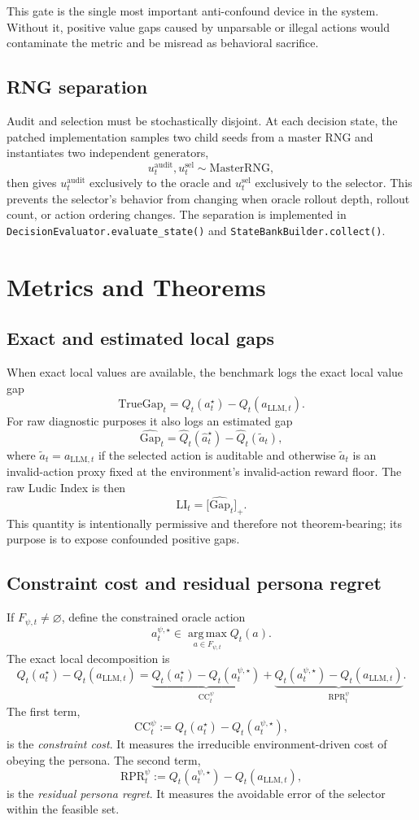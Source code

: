 \documentclass[10pt]{article}
\newcommand{\CC}{\mathrm{CC}}
\newcommand{\RPR}{\mathrm{RPR}}
\newcommand{\LI}{\mathrm{LI}}
\newcommand{\argmax}{\operatorname*{arg\,max}}
\begin{document}
This gate is the single most important anti-confound device in the system. Without it, positive value gaps caused by unparsable or illegal actions would contaminate the metric and be misread as behavioral sacrifice.

\subsection{RNG separation}
Audit and selection must be stochastically disjoint. At each decision state, the patched implementation samples two child seeds from a master RNG and instantiates two independent generators,
$$
u_t^{\mathrm{audit}}, u_t^{\mathrm{sel}} \sim \mathrm{MasterRNG},
$$
then gives $u_t^{\mathrm{audit}}$ exclusively to the oracle and $u_t^{\mathrm{sel}}$ exclusively to the selector. This prevents the selector's behavior from changing when oracle rollout depth, rollout count, or action ordering changes. The separation is implemented in \texttt{DecisionEvaluator.evaluate\_state()} and \texttt{StateBankBuilder.collect()}.

\section{Metrics and Theorems}
\subsection{Exact and estimated local gaps}
When exact local values are available, the benchmark logs the exact local value gap
$$
\mathrm{TrueGap}_t = Q_t(a_t^\star) - Q_t(a_{\mathrm{LLM},t}).
$$
For raw diagnostic purposes it also logs an estimated gap
$$
\widehat{\mathrm{Gap}}_t = \hat Q_t(\hat a_t^\star) - \hat Q_t(\tilde a_t),
$$
where $\tilde a_t = a_{\mathrm{LLM},t}$ if the selected action is auditable and otherwise $\tilde a_t$ is an invalid-action proxy fixed at the environment's invalid-action reward floor. The raw Ludic Index is then
$$
\LI_t = \bigl[\widehat{\mathrm{Gap}}_t\bigr]_+.
$$
This quantity is intentionally permissive and therefore not theorem-bearing; its purpose is to expose confounded positive gaps.

\subsection{Constraint cost and residual persona regret}
If $F_{\psi,t} \neq \varnothing$, define the constrained oracle action
$$
a_t^{\psi,\star} \in \argmax_{a \in F_{\psi,t}} Q_t(a).
$$
The exact local decomposition is
$$
Q_t(a_t^\star) - Q_t(a_{\mathrm{LLM},t})
=
\underbrace{Q_t(a_t^\star) - Q_t(a_t^{\psi,\star})}_{\CC_t^\psi}
+
\underbrace{Q_t(a_t^{\psi,\star}) - Q_t(a_{\mathrm{LLM},t})}_{\RPR_t^\psi}.
$$
The first term,
$$
\CC_t^\psi := Q_t(a_t^\star) - Q_t(a_t^{\psi,\star}),
$$
is the \emph{constraint cost}. It measures the irreducible environment-driven cost of obeying the persona. The second term,
$$
\RPR_t^\psi := Q_t(a_t^{\psi,\star}) - Q_t(a_{\mathrm{LLM},t}),
$$
is the \emph{residual persona regret}. It measures the avoidable error of the selector within the feasible set.
\end{document}
